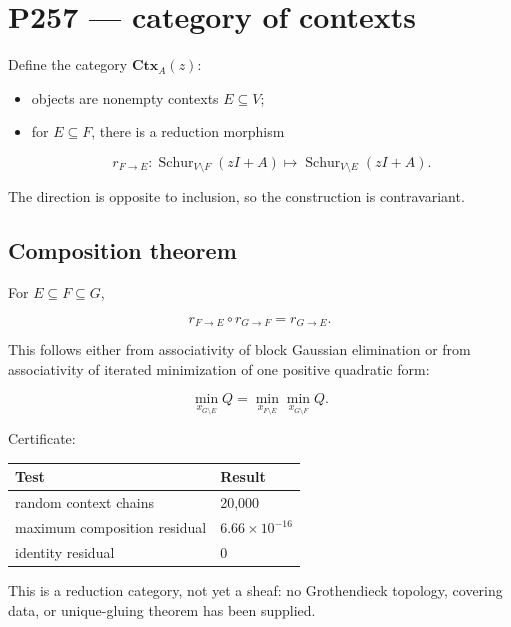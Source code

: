 \documentclass[11pt,a4paper,openany]{report}
\begin{document}
\chapter{P257 --- category of contexts}

Define the category \(\mathbf{Ctx}_A(z)\):

\begin{itemize}
\item 
objects are nonempty contexts \(E\subseteq V\);

\item 
for \(E\subseteq F\), there is a reduction morphism

\[
  r_{F\to E}:
  \operatorname{Schur}_{V\setminus F}(zI+A)
  \longmapsto
  \operatorname{Schur}_{V\setminus E}(zI+A).
  \]

\end{itemize}

The direction is opposite to inclusion, so the construction is contravariant.

\section{Composition theorem}

For \(E\subseteq F\subseteq G\),

\[
r_{F\to E}\circ r_{G\to F}=r_{G\to E}.
\]

This follows either from associativity of block Gaussian elimination or from associativity of iterated minimization of one positive quadratic form:

\[
\min_{x_{G\setminus E}}Q
=
\min_{x_{F\setminus E}}
\min_{x_{G\setminus F}}Q.
\]

Certificate:

\begin{center}
\begingroup\small
\setlength{\tabcolsep}{2.5pt}
\renewcommand{\arraystretch}{1.16}
\begin{longtable}{@{}p{}p{}@{}}
\toprule
\textbf{Test} & \textbf{Result} \\
\midrule
\endhead
random context chains & 20,000 \\
maximum composition residual & \(6.66\times10^{-16}\) \\
identity residual & 0 \\
\bottomrule
\end{longtable}
\endgroup
\end{center}

This is a reduction category, not yet a sheaf: no Grothendieck topology, covering data, or unique-gluing theorem has been supplied.
\end{document}
